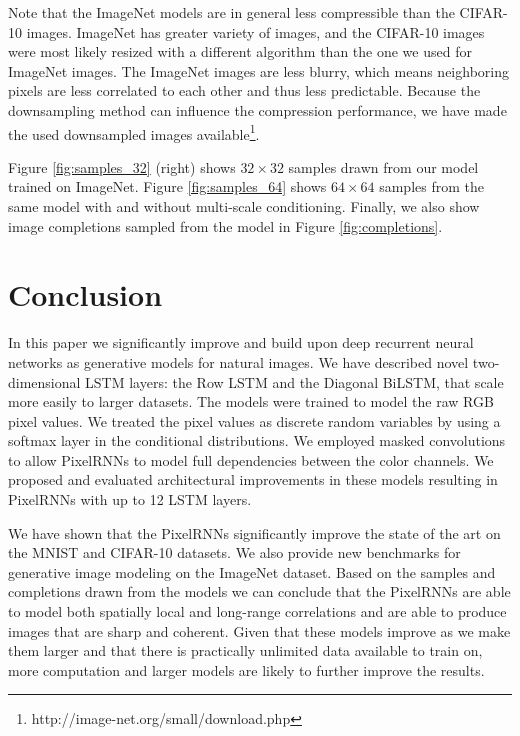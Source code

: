 \documentclass{article}
\begin{document}
Note that the ImageNet models are in general less compressible than the CIFAR-10 images. ImageNet has greater variety of images, and the CIFAR-10 images were most likely resized with a different algorithm than the one we used for ImageNet images. The ImageNet images are less blurry, which means neighboring pixels are less correlated to each other and thus less predictable. Because the downsampling method can influence the compression performance, we have made the used downsampled images available\footnote{http://image-net.org/small/download.php}.

Figure \ref{fig:samples_32} (right) shows $32\times32$ samples drawn from our model trained on ImageNet. Figure \ref{fig:samples_64} shows $64\times64$ samples from the same model with and without multi-scale conditioning. Finally, we also show image completions sampled from the model in Figure \ref{fig:completions}.






 

\section{Conclusion}

In this paper we significantly improve and build upon deep recurrent neural networks as generative models for natural images. We have described novel two-dimensional LSTM layers: the Row LSTM and the Diagonal BiLSTM, that scale more easily to larger datasets. The models were trained to model the raw RGB pixel values. We treated the pixel values as discrete random variables by using a softmax layer in the conditional distributions. We employed masked convolutions to allow PixelRNNs to model full dependencies between the color channels. We proposed and evaluated architectural improvements in these models resulting in PixelRNNs with up to 12 LSTM layers.

We have shown that the PixelRNNs significantly improve the state of the art on the MNIST and CIFAR-10 datasets. We also provide new benchmarks for generative image modeling on the ImageNet dataset. Based on the samples and completions drawn from the models we can conclude that the PixelRNNs are able to model both spatially local and long-range correlations and are able to produce images that are sharp and coherent.
Given that these models improve as we make them larger and that there is practically unlimited data available to train on, more computation and larger models are likely to further improve the results.
\end{document}

